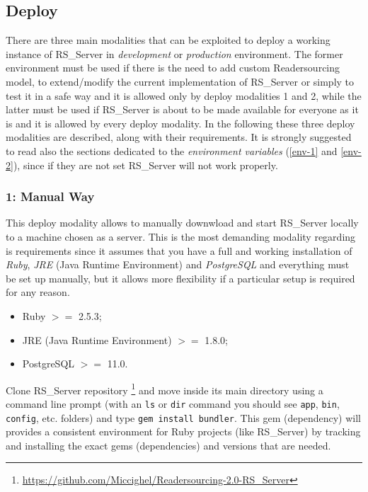 \documentclass[a4paper, english]{article}
\newcounter{subsubsubsection}[subsubsection]
\begin{document}
\subsection{Deploy}

There are three main modalities that can be exploited to deploy a working instance of RS\_Server in \emph{development} or \emph{production} environment. The former environment must be used if there is the need to add custom Readersourcing model, to extend/modify the current implementation of RS\_Server or simply to test it in a safe way and it is allowed only by deploy modalities 1 and 2, while the latter must be used if RS\_Server is about to be made available for everyone as it is and it is allowed by every deploy modality. In the following these three deploy modalities are described, along with their requirements. It is strongly suggested to read also the sections dedicated to the \emph{environment variables} (\ref{env-1} and \ref{env-2}), since if they are not set RS\_Server will not work properly.

\subsubsection{1: Manual Way}

\label{deploy1}

This deploy modality allows to manually downwload and start RS\_Server locally to a machine chosen as a server. This is the most demanding modality regarding is requirements since it assumes that you have a full and working installation of \emph{Ruby}, \emph{JRE} (Java Runtime Environment) and \emph{PostgreSQL} and everything must be set up manually, but it allows more flexibility if a particular setup is required for any reason. 


\begin{itemize}
\item Ruby $>=$ 2.5.3;
\item JRE (Java Runtime Environment) $>=$ 1.8.0;
\item PostgreSQL $>=$ 11.0.
\end{itemize}


Clone RS\_Server repository \footnote{\url{https://github.com/Miccighel/Readersourcing-2.0-RS_Server}} and move inside its main directory using a command line prompt (with an \verb|ls| or \verb|dir| command you should see \verb|app|, \verb|bin|, \verb|config|, etc. folders) and type \verb|gem install bundler|. This gem (dependency) will provides a consistent environment for Ruby projects (like RS\_Server) by tracking and installing the exact gems (dependencies) and versions that are needed. 
\end{document}
